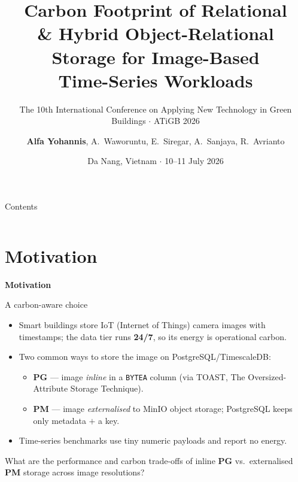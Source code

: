 \documentclass[aspectratio=169, table]{beamer}
\title{Carbon Footprint of Relational\\[1pt]
  \& Hybrid Object-Relational\\[1pt]
  Storage for Image-Based\\[1pt]
  Time-Series Workloads\\[1pt]
}
\subtitle{The 10th International Conference on Applying New 
Technology in Green Buildings $\cdot$ ATiGB 2026}
\author{\textbf{Alfa Yohannis}, A.\ Waworuntu, E.\ Siregar, A.\ Sanjaya, R.\ Avrianto}
\date{Da Nang, Vietnam $\cdot$ 10--11 July 2026}
\newcommand{\sectionframe}[1]{%
  \begin{frame}{\hfill}\centering\Huge{\textbf{#1}}\end{frame}}
\newcommand{\takeaway}[1]{\vspace{3pt}{\footnotesize #1}}
\begin{document}
\frame{\titlepage}

\begin{frame}{Contents}
  \vspace{12pt}
  \begin{columns}[t]
    \tableofcontents[sections={1-2}]
    \tableofcontents[sections={3-4}]
  \end{columns}
\end{frame}

\section{Motivation}
\sectionframe{Motivation}

\begin{frame}{A carbon-aware choice}
  \vspace{2pt}\footnotesize
  \begin{itemize}\setlength{\itemsep}{3pt}
    \item Smart buildings store IoT (Internet of Things) camera images with timestamps; the data tier runs \textbf{24/7}, so its energy is operational carbon.
    \item Two common ways to store the image on PostgreSQL/TimescaleDB:
      \begin{itemize}\footnotesize
        \item \textbf{PG} --- image \emph{inline} in a \texttt{BYTEA} column (via TOAST, The Oversized-Attribute Storage Technique).
        \item \textbf{PM} --- image \emph{externalised} to MinIO object storage; PostgreSQL keeps only metadata $+$ a key.
      \end{itemize}
    \item Time-series benchmarks use tiny numeric payloads and report no energy.
  \end{itemize}
  \vspace{2pt}
  \begin{rqbox}\footnotesize
    What are the performance and carbon trade-offs of inline \textbf{PG} vs.\ externalised \textbf{PM} storage across image resolutions?
  \end{rqbox}
  \takeaway{Inline simplicity vs.\ externalised object transport --- which is greener, and when?}
\end{frame}

\end{document}
